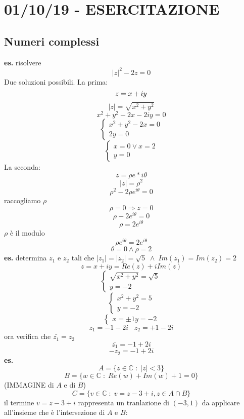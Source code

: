 \section*{01/10/19 - ESERCITAZIONE}
\subsection*{Numeri complessi}
\textbf{es.} risolvere
\[
    |z|^2 -2z = 0
\] 
Due soluzioni possibili. La prima:
\[
    z=x+iy\\
\]
\[
    |z| =\sqrt{x^2+y^2}
\] 
\[
    x^2 +y^2-2x-2iy = 0
\] 
\[
    \begin{cases}
        x^2+y^2 -2x = 0 \\
        2y = 0 
    \end{cases} 
\]
\[
    \begin{cases}
        x = 0 \lor x=2 \\
        y=0
    \end{cases} 
\]
La seconda:
\[
    z = \rho e*{i\theta}
\] 
\[
    |z| = \rho^2
\] 
\[
    \rho^2 -2\rho e ^{i\theta} = 0
\] 
raccogliamo $\rho$
\[
    \rho = 0 \Rightarrow z =0
\] 
\[
    \rho -2 e^{i\theta} = 0  
\]
\[
    \rho = 2e^{i\theta}
\] 
$\rho$ è il modulo
\[
    \rho e^{i\theta} = 2 e^{i\theta}
\] 
\[
    \theta = 0 \land \rho = 2
\] 
\newline
\textbf{es.} determina $z_1$ e $z_2$ tali che $|z_1| = |z_2| = \sqrt{5} \; \land \; Im(z_1) = Im(z_2) = 2 $
\[
    z = x+iy = Re(z) + iIm(z)
\] 
\[
    \begin{cases}
        \sqrt{x^2 + y^2} = \sqrt{5}\\
        y=-2
    \end{cases}
\] 
\[
    \begin{cases}
        x^2 + y^2 = 5\\
        y=-2
    \end{cases}
\] 
\[
    \begin{cases}
        x = \pm 1
        y=-2
    \end{cases}
\] 
\[
    z_1 = -1-2i \;\;\; z_2 = +1-2i
\] 
ora verifica che $\bar{z_1} = z_2$
\[
    \bar{z_1}= -1+2i
\]  
\[
    -z_2 = -1+2i
\] 
\newline
\textbf{es.}
\[
    A =\{z \in \mathbb{C} \;:\; |z| < 3\}
\] 
\[
    B = \{w \in \mathbb{C} \;:\; Re(w) +Im(w) +1 = 0\}
\] 
(IMMAGINE di $A$ e di $B$)
\[
    C=\{v \in \mathbb{C} \;:\; v = z-3+i , z \in A \cap B\}
\] 
il termine $v = z-3+i$ rappresenta un tranlazione di $(-3,1)$ da applicare all'insieme che è l'intersezione di $A$ e $B$:

